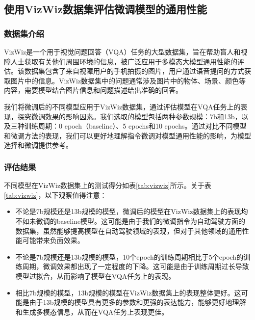 \documentclass[
    linespread = 1.25
]{ctexart}
\begin{document}
\subsection{使用VizWiz数据集评估微调模型的通用性能}

\subsubsection{数据集介绍}

VizWiz是一个用于视觉问题回答（VQA）任务的大型数据集\cite{gurari2018vizwizgrandchallengeanswering}，旨在帮助盲人和视障人士获取有关他们周围环境的信息，被广泛应用于多模态大模型通用性能的评估。该数据集包含了来自视障用户的手机拍摄的图片，用户通过语音提问的方式获取图片中的信息。VizWiz数据集中的问题通常涉及图片中的物体、场景、颜色等内容，需要模型结合图片信息和问题描述给出准确的回答。

我们将微调后的不同模型应用于VizWiz数据集，通过评估模型在VQA任务上的表现，探究微调效果的影响因素。我们选取的模型包括两种参数规模：7b和13b，以及三种训练周期：0 epoch（baseline）、5 epochs和10 epochs。通过对比不同模型和微调方法的表现，我们可以更好地理解指令微调对模型通用性能的影响，为模型选择和微调提供参考。

\subsubsection{评估结果}

不同模型在VizWiz数据集上的测试得分如表\ref{tab:vizwiz}所示。关于表\ref{tab:vizwiz}，以下观察值得注意：
\begin{itemize}
  \item 不论是7b规模还是13b规模的模型，微调后的模型在VizWiz数据集上的表现均不如未微调的baseline模型。这可能是由于我们的微调指令为自动驾驶方面的数据集，虽然能够提高模型在自动驾驶领域的表现，但对于其他领域的通用性能可能带来负面效果。
  \item 不论是7b规模还是13b规模的模型，10个epoch的训练周期相比于5个epoch的训练周期，微调效果都出现了一定程度的下降。这可能是由于训练周期过长导致模型过拟合，从而影响了模型在VQA任务上的表现。
  \item 相比7b规模的模型，13b规模的模型在VizWiz数据集上的表现整体更好。这可能是由于13b规模的模型具有更多的参数和更强的表达能力，能够更好地理解和生成多模态信息，从而在VQA任务上表现更佳。
\end{itemize}
\end{document}
